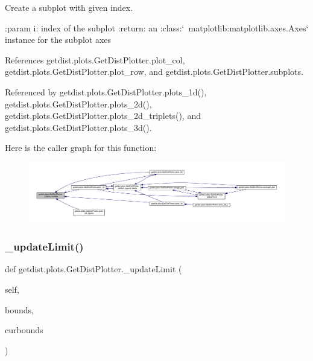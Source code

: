 \begin{DoxyVerb}Create a subplot with given index.

:param i: index of the subplot
:return: an :class:`~matplotlib:matplotlib.axes.Axes` instance for the subplot axes
\end{DoxyVerb}
 

References getdist.\+plots.\+Get\+Dist\+Plotter.\+plot\+\_\+col, getdist.\+plots.\+Get\+Dist\+Plotter.\+plot\+\_\+row, and getdist.\+plots.\+Get\+Dist\+Plotter.\+subplots.



Referenced by getdist.\+plots.\+Get\+Dist\+Plotter.\+plots\+\_\+1d(), getdist.\+plots.\+Get\+Dist\+Plotter.\+plots\+\_\+2d(), getdist.\+plots.\+Get\+Dist\+Plotter.\+plots\+\_\+2d\+\_\+triplets(), and getdist.\+plots.\+Get\+Dist\+Plotter.\+plots\+\_\+3d().

Here is the caller graph for this function\+:
\nopagebreak
\begin{figure}[H]
\begin{center}
\leavevmode
\includegraphics[width=350pt]{classgetdist_1_1plots_1_1GetDistPlotter_ab193e6cfc6a0ea34b119fe7d1f3aee54_icgraph}
\end{center}
\end{figure}
\mbox{\label{classgetdist_1_1plots_1_1GetDistPlotter_adc50adc1d2b8ceff5c95ea31a9e886a1}} 
\subsubsection{\texorpdfstring{\+\_\+update\+Limit()}{\_updateLimit()}}
{\footnotesize\ttfamily def getdist.\+plots.\+Get\+Dist\+Plotter.\+\_\+update\+Limit (\begin{DoxyParamCaption}\item[{}]{self,  }\item[{}]{bounds,  }\item[{}]{curbounds }\end{DoxyParamCaption})\hspace{0.3cm}{\ttfamily [private]}}

